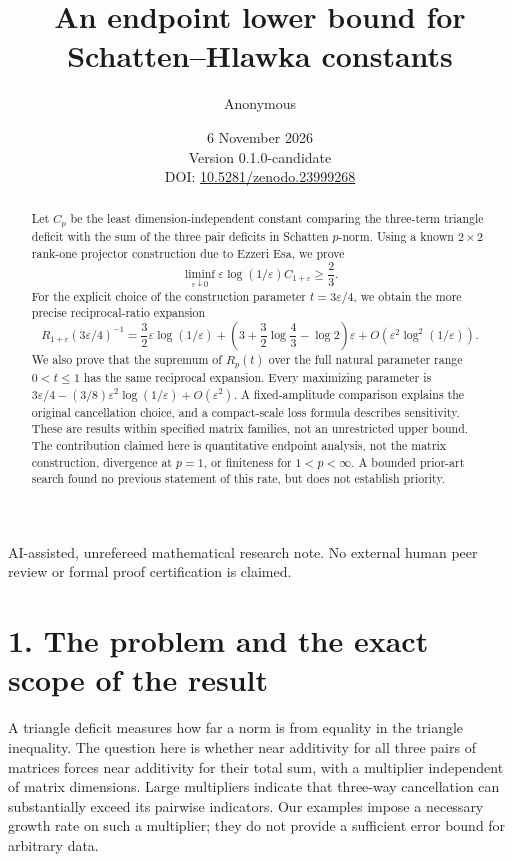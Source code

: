 \documentclass[11pt,a4paper]{article}
\title{An endpoint lower bound for Schatten--Hlawka constants}
\author{Anonymous}
\date{6 November 2026\\Version 0.1.0-candidate\\\small DOI: \href{https://doi.org/10.5281/zenodo.23999268}{10.5281/zenodo.23999268}}
\begin{document}
\maketitle


AI-assisted, unrefereed mathematical research note. No external human peer review or formal proof certification is claimed.

\begin{abstract}

Let \(C_p\) be the least dimension-independent constant comparing the three-term triangle deficit with the sum of the three pair deficits in Schatten \(p\)-norm. Using a known \(2\times2\) rank-one projector construction due to Ezzeri Esa, we prove \[
\liminf_{\varepsilon\downarrow0}\varepsilon\log(1/\varepsilon)C_{1+\varepsilon}\ge\frac23.
\] For the explicit choice of the construction parameter \(t=3\varepsilon/4\), we obtain the more precise reciprocal-ratio expansion \[
R_{1+\varepsilon}(3\varepsilon/4)^{-1}
=\frac32\varepsilon\log(1/\varepsilon)
+\left(3+\frac32\log\frac43-\log2\right)\varepsilon
+O\!\left(\varepsilon^2\log^2(1/\varepsilon)\right).
\] We also prove that the supremum of \(R_p(t)\) over the full natural parameter range \(0<t\le1\) has the same reciprocal expansion. Every maximizing parameter is \(3\varepsilon/4-(3/8)\varepsilon^2\log(1/\varepsilon)+O(\varepsilon^2)\). A fixed-amplitude comparison explains the original cancellation choice, and a compact-scale loss formula describes sensitivity. These are results within specified matrix families, not an unrestricted upper bound. The contribution claimed here is quantitative endpoint analysis, not the matrix construction, divergence at \(p=1\), or finiteness for \(1<p<\infty\). A bounded prior-art search found no previous statement of this rate, but does not establish priority.

\end{abstract}
\section*{1. The problem and the exact scope of the result}\label{the-problem-and-the-exact-scope-of-the-result}

A triangle deficit measures how far a norm is from equality in the triangle inequality. The question here is whether near additivity for all three pairs of matrices forces near additivity for their total sum, with a multiplier independent of matrix dimensions. Large multipliers indicate that three-way cancellation can substantially exceed its pairwise indicators. Our examples impose a necessary growth rate on such a multiplier; they do not provide a sufficient error bound for arbitrary data.
\end{document}
